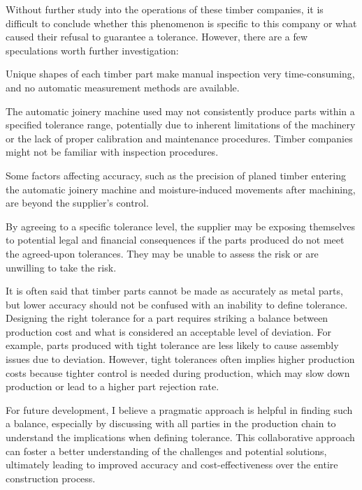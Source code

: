 Without further study into the operations of these timber companies, it is difficult to conclude whether this phenomenon is specific to this company or what caused their refusal to guarantee a tolerance. However, there are a few speculations worth further investigation:

\begin{description}[style=unboxed] %

	\item [Economic Considerations --] Unique shapes of each timber part make manual inspection very time-consuming, and no automatic measurement methods are available.

	\item [Limited Capabilities --] The automatic joinery machine used may not consistently produce parts within a specified tolerance range, potentially due to inherent limitations of the machinery or the lack of proper calibration and maintenance procedures. Timber companies might not be familiar with inspection procedures.

	\item [Industry Norms --] Some factors affecting accuracy, such as the precision of planed timber entering the automatic joinery machine and moisture-induced movements after machining, are beyond the supplier's control.

	\item [Liability Concerns --] By agreeing to a specific tolerance level, the supplier may be exposing themselves to potential legal and financial consequences if the parts produced do not meet the agreed-upon tolerances. They may be unable to assess the risk or are unwilling to take the risk.

\end{description}
It is often said that timber parts cannot be made as accurately as metal parts, but lower accuracy should not be confused with an inability to define tolerance. 
Designing the right tolerance for a part requires striking a balance between production cost and what is considered an acceptable level of deviation. For example, parts produced with tight tolerance are less likely to cause assembly issues due to deviation. However, tight tolerances often implies higher production costs because tighter control is needed during production, which may slow down production or lead to a higher part rejection rate.

For future development, I believe a pragmatic approach is helpful in finding such a balance, especially by discussing with all parties in the production chain to understand the implications when defining tolerance. This collaborative approach can foster a better understanding of the challenges and potential solutions, ultimately leading to improved accuracy and cost-effectiveness over the entire construction process.

